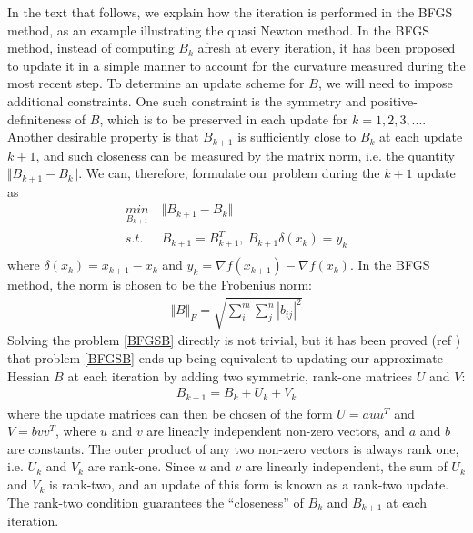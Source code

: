 \documentclass  [
  paper    = a4,
  BCOR     = 10mm,
  twoside,
  fontsize = 12pt,
  fleqn,
  toc      = bibnumbered,
  toc      = listofnumbered,
  numbers  = noendperiod,
  headings = normal,
  listof   = leveldown,
  version  = 3.03
]                                       {scrreprt}
\newcommand{\<}{\langle}
\renewcommand{\>}{\rangle}
\begin{document}
In the text that follows, we explain how the iteration is performed in the BFGS method, as an example illustrating the quasi Newton method. In the BFGS method, instead of computing $B_k$ afresh at every iteration, it has been proposed to update it in a simple manner to account for the curvature measured during the most recent step. To determine an update scheme for $B$, we will need to impose additional constraints. One such constraint is the symmetry and positive-definiteness of $B$, which is to be preserved in each update for $k = 1,2, 3, ...$. Another desirable property is that $B_{k+1}$ is sufficiently close to $B_k$ at each update $k+1$, and such closeness can be measured by the matrix norm, i.e. the quantity $\Vert B_{k+1} - B_{k} \Vert$. We can, therefore, formulate our problem during the $k+1$ update as 
\begin{equation}
	\begin{aligned}
		\underset{B_{k+1}}{min} \  &  \Vert B_{k+1} - B_{k} \Vert\\
		s.t.\ \  & B_{k+1}= B_{k+1}^T, \ B_{k+1}\delta(x_k)  = y_k \\
	\end{aligned}
	\label{BFGSB}
\end{equation}
where $\delta(x_k) = x_{k+1} -x_k$ and $y_k = \nabla f(x_{k+1}) - \nabla f(x_k)$. In the BFGS method, the norm is chosen to be the Frobenius norm:
\begin{align*}
	\Vert B \Vert_F = \sqrt{\sum_{i}^{m} \sum_{j}^{n} |b_{ij}|^2} 
\end{align*}
Solving the problem \ref{BFGSB} directly is not trivial, but it has been proved (ref \cite{JorSte06}) that problem  \ref{BFGSB} ends up being equivalent to updating our approximate Hessian $B$ at each iteration by adding two symmetric, rank-one matrices $U$ and $V$:
\begin{align*}
	B_{k+1} = B_k + U_k + V_k
\end{align*}
where the update matrices can then be chosen of the form $U = a u u^T$ and $V = b v v^T$, where $u$ and $v$ are linearly independent non-zero vectors, and $a$ and $b$ are constants.  The outer product of any two non-zero vectors is always rank one, i.e. $U_k$ and $V_k$ are rank-one. Since $u$ and $v$ are linearly independent, the sum of $U_k$ and $V_k$ is rank-two, and an update of this form is known as a rank-two update. The rank-two condition guarantees the “closeness” of $B_k$ and $B_{k+1}$ at each iteration. 
\end{document}
